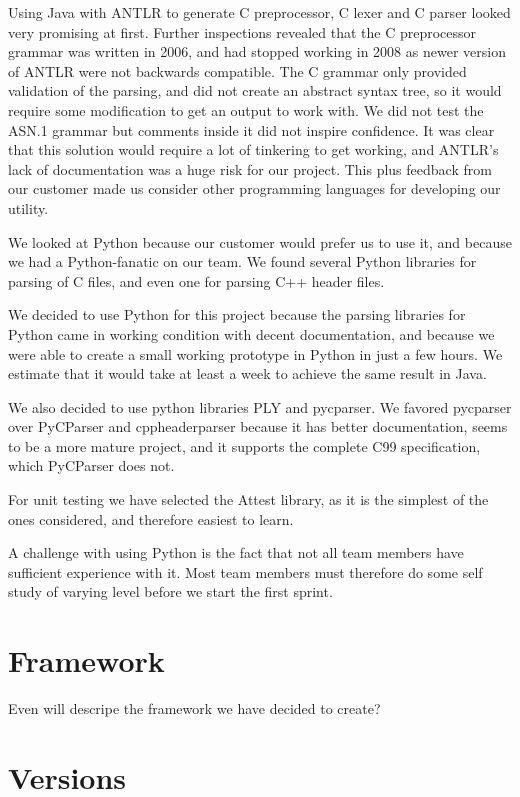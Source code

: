 \begin{description}
Using Java with ANTLR to generate C preprocessor, C lexer and C parser looked
very promising at first. Further inspections revealed that the C preprocessor
grammar was written in 2006, and had stopped working in 2008 as newer version
of ANTLR were not backwards compatible. The C grammar only provided validation
of the parsing, and did not create an abstract syntax tree, so it would require
some modification to get an output to work with. We did not test the ASN.1
grammar but comments inside it did not inspire confidence. It was clear that
this solution would require a lot of tinkering to get working, and ANTLR’s lack
of documentation was a huge risk for our project. This plus feedback from our
customer made us consider other programming languages for developing our
utility.

We looked at Python because our customer would prefer us to use it, and because
we had a Python-fanatic on our team. We found several Python libraries for
parsing of C files, and even one for parsing C++ header files.

We decided to use Python for this project because the parsing libraries for
Python came in working condition with decent documentation, and because we
were able to create a small working prototype in Python in just a few hours.
We estimate that it would take at least a week to achieve the same result in
Java.

We also decided to use python libraries PLY and pycparser. We favored pycparser
over PyCParser and cppheaderparser because it has better documentation, seems
to be a more mature project, and it supports the complete C99 specification,
which PyCParser does not.

For unit testing we have selected the Attest library, as it is the simplest of
the ones considered, and therefore easiest to learn.

A challenge with using Python is the fact that not all team members have
sufficient experience with it. Most team members must therefore do some self
study of varying level before we start the first sprint.

\section{Framework}
Even will descripe the framework we have decided to create?

\section{Versions}


\end{description}
